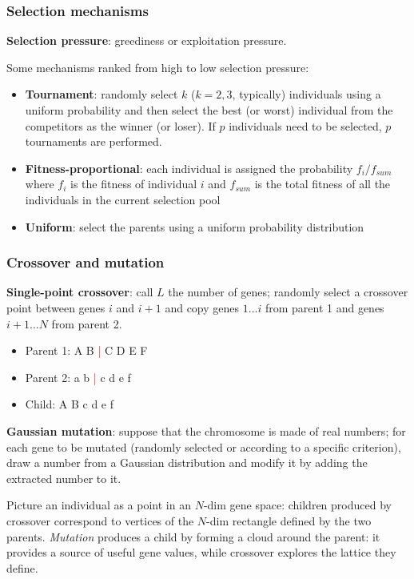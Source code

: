 \documentclass{beamer}
\begin{document}
			\begin{frame}
				\frametitle{Selection mechanisms}
				
				\textbf{Selection pressure}: greediness or exploitation pressure.
				
				\vspace{5mm}
				
				Some mechanisms ranked from high to low selection pressure:
				\begin{itemize}
					\item \textbf{Tournament}: randomly select $k$ ($k=2,3$, typically) individuals using a uniform probability and then select the best (or worst) individual from the competitors as the winner (or loser). If $p$ individuals need to be selected, $p$ tournaments are performed.
					\item \textbf{Fitness-proportional}: each individual is assigned the probability $f_i/f_{sum}$ where $f_i$ is the fitness of individual $i$ and $f_{sum}$ is the total fitness of all the individuals in the current selection pool 
					\item \textbf{Uniform}: select the parents using a uniform probability distribution
				\end{itemize}
			\end{frame}
			
			\begin{frame}
				\frametitle{Crossover and mutation}
				
				\textbf{Single-point crossover}: call $L$ the number of genes; randomly select a crossover point between genes $i$ and $i+1$ and copy genes $1\dots i$ from parent 1 and genes $i+1...N$ from parent 2.
				\begin{itemize}
					\item Parent 1: A B \textcolor{red}{|} C D E F
					\item Parent 2: a b \textcolor{red}{|} c d e f
					\item Child: A B c d e f
				\end{itemize}
				
				\vspace{5mm}
				
				\textbf{Gaussian mutation}: suppose that the chromosome is made of real numbers; for each gene to be mutated (randomly selected or according to a specific criterion), draw a number from a Gaussian distribution and modify it by adding the extracted number to it.
				
				\vspace{5mm}
				
				Picture an individual as a point in an $N$-dim gene space:  children produced by crossover correspond to vertices of the $N$-dim rectangle defined by the two parents. \textit{Mutation} produces a child by forming a cloud around the parent: it provides a source of useful gene values, while crossover explores the lattice they define.
			
			\end{frame}
			
\end{document}
